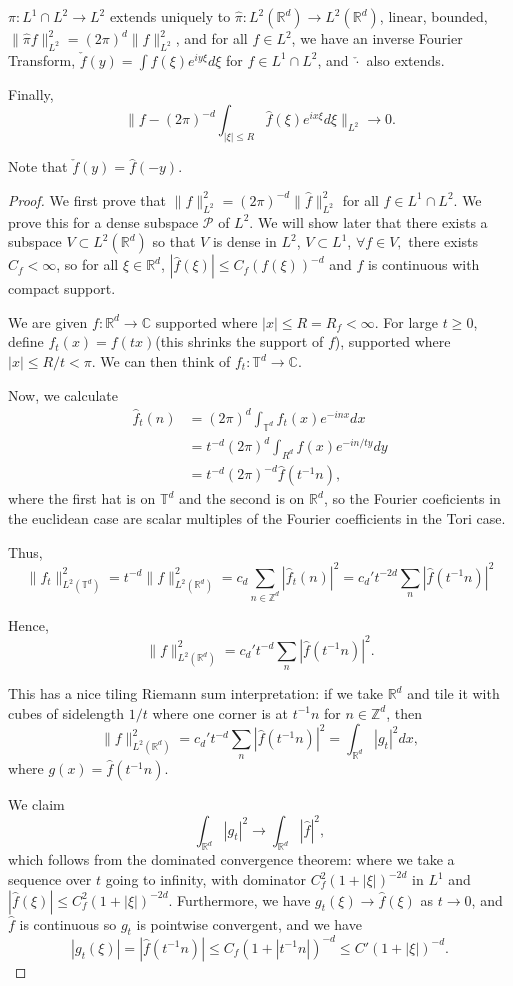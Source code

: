 \documentclass[11pt]{scrartcl}
\newcommand{\Z}{\mathbb{Z}}
\newcommand{\R}{\mathbb{R}}
\newcommand{\C}{\mathbb C}
\newcommand{\T}{\mathbb T}
\begin{document}
\begin{thm} $\pi: L^1\cap L^2 \rightarrow L^2$ extends uniquely to $\hat{\pi}: L^2(\R^d) \rightarrow L^2(\R^d)$, linear, bounded, 
$\|\hat{\pi}f\|_{L^2}^2 = (2\pi)^d\|f\|_{L^2}^2$,
and for all $f \in L^2$, we have an inverse Fourier Transform,
$\check{f}(y) = \int f(\xi)e^{iy\xi}d\xi$ for $f \in L^1 \cap L^2$, and $\check{\cdot}$ also extends.  

Finally, $$\|f - (2\pi)^{-d}\int_{|\xi| \le R} \hat{f}(\xi)e^{ix\xi}d\xi\|_{L^2} \rightarrow 0.$$
\end{thm}
Note that $\check{f}(y) = \hat{f}(-y)$.
\begin{proof}
We first prove that $\|f\|_{L^2}^2 = (2\pi)^{-d}\|\hat{f}\|_{L^2}^2$ for all $f \in L^1 \cap L^2$.  We prove this for a dense subspace $\mathscr{P} $ of $L^2$.  We will show later that there exists a subspace $V \subset L^2(\R^d)$ so that $V$ is dense in $L^2$, $V \subset L^1$, $\forall f \in V,$ there exists $C_f < \infty$, so for all $\xi \in \R^d$, $|\hat{f}(\xi)| \le C_f(f(\xi))^{-d}$ and $f$ is continuous with compact support.

We are given $f: \R^d \rightarrow \C$ supported where $|x |\le R = R_f < \infty$.  For large $t \ge 0$, define $f_t(x) = f(tx)$(this shrinks the support of $f$), supported where $|x| \le R/t < \pi$.  We can then think of $f_t: \T^d \rightarrow \C$.  

Now, we calculate
\begin{align*}
\hat{f}_{t}(n) & = (2\pi)^d\int_{\T^d} f_t(x)e^{-inx}dx\\
&= t^{-d}(2\pi)^d \int_{R^d} f(x)e^{-in/ty}dy \\
&= t^{-d} (2\pi)^{-d}\hat{f}(t^{-1}n),
\end{align*}
where the first hat is on $\T^d$ and the second is on $\R^d$, so the Fourier coeficients in the euclidean case are scalar multiples of the Fourier coefficients in the Tori case.  

Thus,
$$\|f_t\|_{L^2(\T^d)}^2 = t^{-d}\|f\|_{L^2(\R^d)}^2 = c_d\sum_{n \in \Z^d}|\hat{f}_t(n)|^2 = c_d't^{-2d}\sum_{n} |\hat{f}(t^{-1}n)|^2$$

Hence,
$$\|f\|_{L^2(\R^d)}^2 = c_d't^{-d}\sum_{n} |\hat{f}(t^{-1}n)|^2.$$

This has a nice tiling Riemann sum interpretation: if we take $\R^d$ and tile it with cubes of sidelength $1/t$ where one corner is at $t^{-1}n$ for $n \in \Z^d$, then
$$\|f\|_{L^2(\R^d)}^2 = c_d' t^{-d}\sum_{n}\left |\hat{f}(t^{-1}n)\right |^2 = \int_{\R^d}|g_t|^2 dx,$$
where $g(x) = \hat{f}(t^{-1}n)$.
 
We claim 
$$\int_{\R^d}|g_t|^2 \rightarrow \int_{\R^d}|\hat{f}|^2,$$
which follows from the dominated convergence theorem:  where we take a sequence over $t$ going to infinity, with dominator $C_f^2(1 + |\xi|)^{-2d}$ in $L^1$ and $|\hat{f}(\xi)| \le C_f^2(1 + |\xi|)^{-2d}$. Furthermore, we have $g_t(\xi) \rightarrow \hat{f}(\xi)$ as $t \rightarrow 0$, and $\hat{f}$ is continuous so $g_t$ is pointwise convergent, and we have
$$|g_t(\xi)| = |\hat{f}(t^{-1}n)| \le C_f(1 + |t^{-1}n|)^{-d} \le C'(1 + |\xi|)^{-d}.$$
\end{proof}
\end{document}
